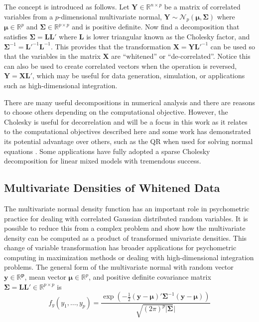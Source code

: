 \documentclass[12pt]{article}
\begin{document}
The concept is introduced as follows. Let $\bm{Y} \in \mathbb{R}^{n \times p}$ be a matrix of correlated variables from a $p$-dimensional multivariate normal, $\bm{Y} \sim \mathcal{N}_p(\bm{\mu}, \bm{\Sigma})$ where $\bm{\mu} \in \mathbb{R}^{p}$ and $\bm{\Sigma} \in \mathbb{R}^{p \times p}$ and is positive definite. Now find a decomposition that satisfies $\bm{\Sigma} = \bm{L}\bm{L}'$ where $\bm{L}$ is lower triangular known as the Cholesky factor, and $\bm{\Sigma}^{-1} = \bm{L'}^{-1}\bm{L}^{-1}$. This provides that the transformation $\bm{X} = \bm{Y}\bm{L}'^{-1}$ can be used so that the variables in the matrix $\bm{X}$ are ``whitened'' or ``de-correlated''. Notice this can also be used to create correlated vectors when the operation is reversed, $\bm{Y}= \bm{X}\bm{L}'$, which may be useful for data generation, simulation, or applications such as high-dimensional integration. 

There are many useful decompositions in numerical analysis \cite{searle:1982,zhang:matrix} and there are reasons to choose others depending on the computational objective. However, the Cholesky is useful for decorrelation and will be a focus in this work as it relates to the computational objectives described here and some work has demonstrated its potential advantage over others, such as the QR when used for solving normal equations \cite{qr:chol}. Some applications have fully adopted a sparse Cholesky decomposition \cite{tim:davis} for linear mixed models \cite{bates:2004} with tremendous success.  

\subsection*{Multivariate Densities of Whitened Data}

The multivariate normal density function has an important role in psychometric practice for dealing with correlated Gaussian distributed random variables. It is possible to reduce this from a complex problem and show how the multivariate density can be computed as a product of transformed univariate densities. This change of variable transformation has broader applications for psychometric computing in maximization methods or dealing with high-dimensional integration problems. The general form of the multivariate normal with random vector $\bm{y\in \mathbb{R}^p}$, mean vector $\bm{\mu} \in \mathbb{R}^p$, and positive definite covariance matrix $\bm{\Sigma}= \bm{L}\bm{L}' \in \mathbb{R}^{p \times p}$ is
\begin{equation}
\label{eqn:multivariate}
f_y(y_1, \ldots, y_p)  =  \frac{\exp(-\frac{1}{2}(\bm{y} - \bm{\mu})'\bm{\Sigma}^{-1}(\bm{y} - \bm{\mu}))}{\sqrt{(2\pi)^p|\bm{\Sigma}}|}
\end{equation}
\end{document}
